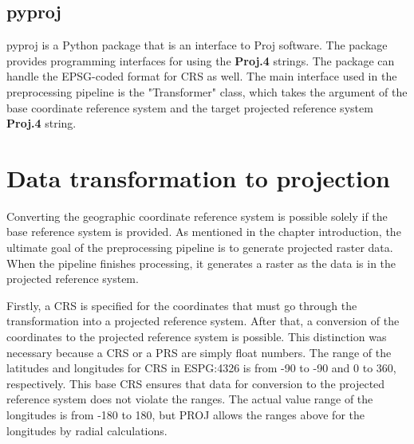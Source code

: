 \subsection{pyproj}
\label{section:pyproj}
pyproj is a Python package that is an interface to Proj software. The package provides programming interfaces for using the \textbf{Proj.4} strings. The package can handle the EPSG-coded format for CRS as well. The main interface used in the preprocessing pipeline is the "Transformer" class, which takes the argument of the base coordinate reference system and the target projected reference system \textbf{Proj.4} string.

\section{Data transformation to projection}
Converting the geographic coordinate reference system is possible solely if the base reference system is provided.
As mentioned in the chapter introduction, the ultimate goal of the preprocessing pipeline is to generate projected raster data. When the pipeline finishes processing, it generates a raster as the data is in the projected reference system.




Firstly, a CRS is specified for the coordinates that must go through the transformation into a projected reference system.
After that, a conversion of the coordinates to the projected reference system is possible.
This distinction was necessary because a CRS or a PRS are simply float numbers.
The range of the latitudes and longitudes for CRS in ESPG:4326 is from -90 to -90 and 0 to 360, respectively.
This base CRS ensures that data for conversion to the projected reference system does not violate the ranges.
The actual value range of the longitudes is from -180 to 180, but PROJ allows the ranges above for the longitudes by radial calculations.

